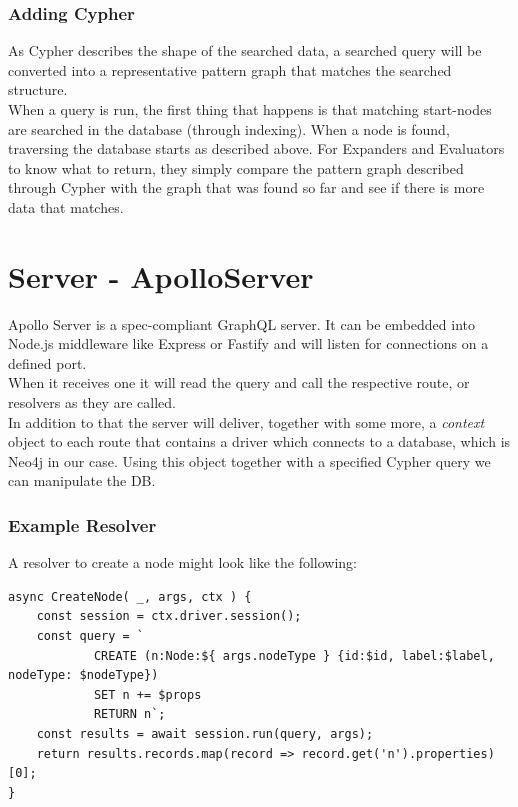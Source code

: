 \subsubsection{Adding Cypher}
As Cypher describes the shape of the searched data, a searched query will be converted into a representative pattern graph that matches the searched structure. \\
When a query is run, the first thing that happens is that matching start-nodes are searched in the database (through indexing). When a node is found, traversing the database starts as described above. For Expanders and Evaluators to know what to return, they simply compare the pattern graph described through Cypher with the graph that was found so far and see if there is more data that matches. 

\section{Server - ApolloServer}
Apollo Server is a spec-compliant GraphQL server. It can be embedded into Node.js middleware like Express or Fastify \cite{ApolloServerIntro} and will listen for connections on a defined port. \\
When it receives one it will read the query and call the respective route, or resolvers as they are called. \\
In addition to that the server will deliver, together with some more, a \emph{context} object to each route that contains a driver which connects to a database, which is Neo4j in our case. Using this object together with a specified Cypher query we can manipulate the DB. 

\subsubsection{Example Resolver}
A resolver to create a node might look like the following:

\begin{lstlisting}[caption={A Basic Resolver},label={ex241}]
async CreateNode( _, args, ctx ) { 
	const session = ctx.driver.session(); 
	const query = ` 
			CREATE (n:Node:${ args.nodeType } {id:$id, label:$label, nodeType: $nodeType}) 
			SET n += $props 
			RETURN n`; 
	const results = await session.run(query, args);
	return results.records.map(record => record.get('n').properties)[0]; 
}
\end{lstlisting}


